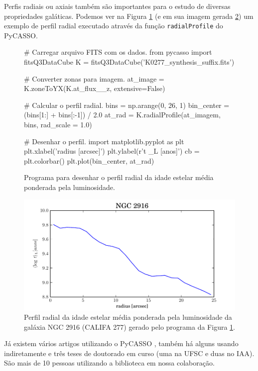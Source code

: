 Perfis radiais ou axiais também são importantes para o estudo de diversas propriedades galáticas. Podemos ver na Figura
\ref{fig:programaPerfRad} (e em sua imagem gerada \ref{fig:perfRad}) um exemplo de perfil radial executado através da
função \texttt{radialProfile} do PyCASSO.

\begin{figure}
\begin{python}
# Carregar arquivo FITS com os dados.
from pycasso import fitsQ3DataCube
K = fitsQ3DataCube('K0277_synthesis_suffix.fits')

# Converter zonas para imagem.
at_image = K.zoneToYX(K.at_flux__z, extensive=False)

# Calcular o perfil radial.
bins = np.arange(0, 26, 1)
bin_center = (bins[1:] + bins[:-1]) / 2.0
at_rad = K.radialProfile(at_imagem, bins, rad_scale = 1.0)

# Desenhar o perfil.
import matplotlib.pyplot as plt
plt.xlabel('radius [arcsec]')
plt.ylabel(r'\langle \log t \langle_L [anos]')
cb = plt.colorbar()
plt.plot(bin_center, at_rad)

\end{python}
	\caption[Exemplo de programa para perfil radial.]
	{Programa para desenhar o perfil radial da idade estelar média ponderada pela
	luminosidade.}
	\label{fig:programaPerfRad}
\end{figure}

\begin{figure}
	\includegraphics{figuras/at_flux_radprof.pdf}
	\caption[Perfil radial da idade estelar média da galáxia NGC 2916 (CALIFA 277).]
	{Perfil radial da idade estelar média ponderada pela luminosidade da galáxia
	NGC 2916 (CALIFA 277) gerado pelo programa da Figura \ref{fig:programaPerfRad}.}
	\label{fig:perfRad}
\end{figure}

Já existem vários artigos utilizando o PyCASSO \citep{CidFernandes2013, CidFernandes2014, Perez2013,
GonzalezDelgado2013}, também há alguns usando indiretamente \citep{Husemann2013, IglesiasParamo2013} e três teses de
doutorado em curso (uma na UFSC e duas no IAA). São mais de 10 pessoas utilizando a biblioteca em nossa colaboração.


